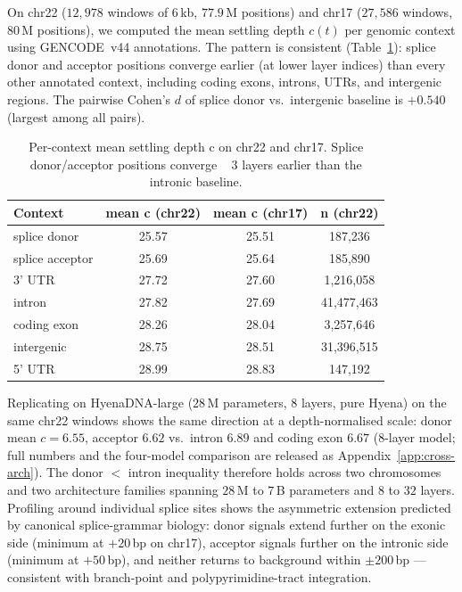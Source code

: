 \documentclass[12pt]{article}
\theoremstyle{plain}
\theoremstyle{definition}
\theoremstyle{remark}
\begin{document}
On chr22 ($12{,}978$ windows of 6\,kb, $77.9$\,M positions) and chr17
($27{,}586$ windows, $80$\,M positions), we computed the mean settling
depth $c(t)$ per genomic context using GENCODE~v44 annotations. The
pattern is consistent (Table~\ref{tab:splice}): splice donor and
acceptor positions converge earlier (at lower layer indices) than every
other annotated context, including coding exons, introns, UTRs, and
intergenic regions. The pairwise Cohen's $d$ of splice donor vs.\
intergenic baseline is $+0.540$ (largest among all pairs).

\begin{table}[t]
\caption{Per-context mean settling depth c on chr22 and chr17. Splice
donor/acceptor positions converge ~ 3 layers earlier than the
intronic baseline.}
\label{tab:splice}
\centering
\small
\begin{tabular}{@{}lccc@{}}
\toprule
Context & mean c (chr22) & mean c (chr17) & n (chr22) \\
\midrule
splice donor    & 25.57 & 25.51 & 187,236 \\
splice acceptor & 25.69 & 25.64 & 185,890 \\
3' UTR        & 27.72 & 27.60 & 1,216,058 \\
intron          & 27.82 & 27.69 & 41,477,463 \\
coding exon     & 28.26 & 28.04 & 3,257,646 \\
intergenic      & 28.75 & 28.51 & 31,396,515 \\
5' UTR        & 28.99 & 28.83 & 147,192 \\
\bottomrule
\end{tabular}
\end{table}

Replicating on HyenaDNA-large ($28$\,M parameters, 8 layers, pure
Hyena) on the same chr22 windows shows the same direction at a
depth-normalised scale: donor mean $c = 6.55$, acceptor $6.62$ vs.\
intron $6.89$ and coding exon $6.67$ (8-layer model; full numbers and
the four-model comparison are released as Appendix~\ref{app:cross-arch}).
The donor $<$ intron inequality therefore holds across two chromosomes
and two architecture families spanning $28$\,M to $7$\,B parameters and
$8$ to $32$ layers. Profiling around individual splice sites shows the
asymmetric extension predicted by canonical splice-grammar biology:
donor signals extend further on the exonic side (minimum at $+20$\,bp
on chr17), acceptor signals further on the intronic side (minimum at
$+50$\,bp), and neither returns to background within $\pm 200$\,bp ---
consistent with branch-point and polypyrimidine-tract integration.
\end{document}
